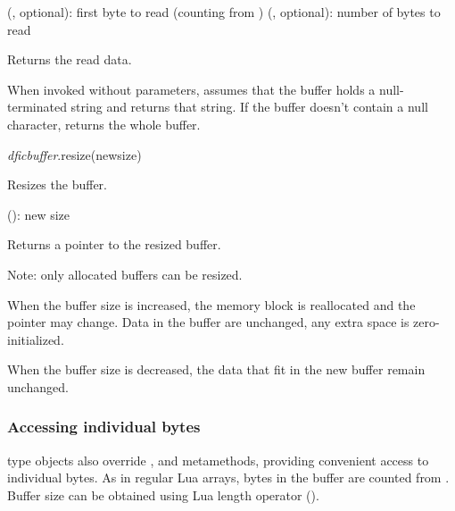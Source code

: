 \documentclass[a4paper,12pt,twoside,extrafontsizes]{memoir}
\begin{document}
\begin{funcparams}
	 (, optional): first byte to read (counting from )
	 (, optional): number of bytes to read
\end{funcparams}

\begin{funcret}
	Returns the read data.
\end{funcret}

\begin{funcremarks}
	When invoked without parameters, assumes that the buffer holds a null-terminated string and returns that string. If the buffer doesn't contain a null character, returns the whole buffer.
\end{funcremarks}


\begin{luafuncprototype}
\emph{dficbuffer}.resize(newsize)
\end{luafuncprototype}

\begin{funcdescr}
	Resizes the buffer.
\end{funcdescr}

\begin{funcparams}
	 (): new size
\end{funcparams}

\begin{funcret}
	Returns a pointer to the resized buffer.
\end{funcret}

\begin{funcremarks}
	Note: only allocated buffers can be resized.

	When the buffer size is increased, the memory block is reallocated and the pointer may change. Data in the buffer are unchanged, any extra space is zero-initialized.
	
	When the buffer size is decreased, the data that fit in the new buffer remain unchanged.
\end{funcremarks}

\subsubsection{Accessing individual bytes}

 type objects also override ,  and  metamethods, providing convenient access to individual bytes. As in regular Lua arrays, bytes in the buffer are counted from . Buffer size can be obtained using Lua length operator (\luaexpr{\#}).
\end{document}
